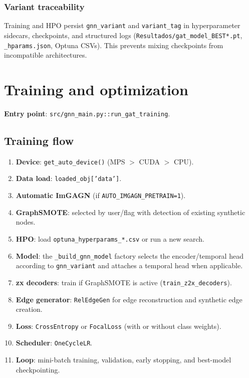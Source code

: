 \subsubsection{Variant traceability}
Training and HPO persist \texttt{gnn\_variant} and \texttt{variant\_tag}
in hyperparameter sidecars, checkpoints, and structured logs
(\texttt{Resultados/gat\_model\_BEST*.pt}, \texttt{\_hparams.json}, Optuna CSVs).
This prevents mixing checkpoints from incompatible architectures.

\section{Training and optimization}
\textbf{Entry point}: \texttt{src/gnn\_main.py::run\_gat\_training}.

\subsection{Training flow}
\begin{enumerate}[leftmargin=*]
  \item \textbf{Device}: \texttt{get\_auto\_device()} (MPS $>$ CUDA $>$ CPU).
  \item \textbf{Data load}: \texttt{loaded\_obj['data']}.
  \item \textbf{Automatic ImGAGN} (if \texttt{AUTO\_IMGAGN\_PRETRAIN=1}).
  \item \textbf{GraphSMOTE}: selected by user/flag with detection of existing synthetic nodes.
  \item \textbf{HPO}: load \texttt{optuna\_hyperparams\_*.csv} or run a new search.
  \item \textbf{Model}: the \texttt{\_build\_gnn\_model} factory selects the encoder/temporal head according to \texttt{gnn\_variant} and attaches a temporal head when applicable.
  \item \textbf{z\textrightarrow x decoders}: train if GraphSMOTE is active (\texttt{train\_z2x\_decoders}).
  \item \textbf{Edge generator}: \texttt{RelEdgeGen} for edge reconstruction and synthetic edge creation.
  \item \textbf{Loss}: \texttt{CrossEntropy} or \texttt{FocalLoss} (with or without class weights).
  \item \textbf{Scheduler}: \texttt{OneCycleLR}.
  \item \textbf{Loop}: mini-batch training, validation, early stopping, and best-model checkpointing.
\end{enumerate}

